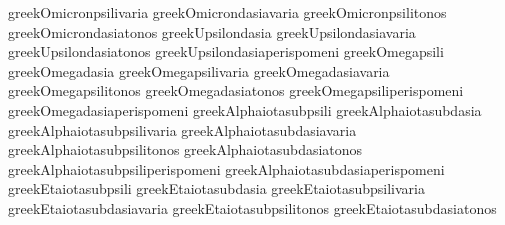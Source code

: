  greekOmicronpsilivaria            {\greekpsilivaria \greekOmicron}
 greekOmicrondasiavaria            {\greekdasiavaria \greekOmicron}
 greekOmicronpsilitonos            {\greekpsilitonos \greekOmicron}
 greekOmicrondasiatonos            {\greekdasiatonos \greekOmicron}
 greekUpsilondasia                 {\greekdasia \greekUpsilon}
 greekUpsilondasiavaria            {\greekdasiavaria \greekUpsilon}
 greekUpsilondasiatonos            {\greekdasiatonos \greekUpsilon}
 greekUpsilondasiaperispomeni      {\greekdasiaperispomeni \greekUpsilon}
 greekOmegapsili                   {\greekpsili \greekOmega}
 greekOmegadasia                   {\greekdasia \greekOmega}
 greekOmegapsilivaria              {\greekpsilivaria \greekOmega}
 greekOmegadasiavaria              {\greekdasiavaria \greekOmega}
 greekOmegapsilitonos              {\greekpsilitonos \greekOmega}
 greekOmegadasiatonos              {\greekdasiatonos \greekOmega}
 greekOmegapsiliperispomeni        {\greekpsiliperispomeni \greekOmega}
 greekOmegadasiaperispomeni        {\greekdasiaperispomeni \greekOmega}
 greekAlphaiotasubpsili            {\greekpsili \greekAlpha \greekiota}
 greekAlphaiotasubdasia            {\greekdasia \greekAlpha \greekiota}
 greekAlphaiotasubpsilivaria       {\greekpsilivaria \greekAlpha \greekiota}
 greekAlphaiotasubdasiavaria       {\greekdasiavaria \greekAlpha \greekiota}
 greekAlphaiotasubpsilitonos       {\greekpsilitonos \greekAlpha \greekiota}
 greekAlphaiotasubdasiatonos       {\greekdasiatonos \greekAlpha \greekiota}
 greekAlphaiotasubpsiliperispomeni {\greekpsiliperispomeni \greekAlpha \greekiota}
 greekAlphaiotasubdasiaperispomeni {\greekdasiaperispomeni \greekAlpha \greekiota}
 greekEtaiotasubpsili              {\greekpsili \greekEta \greekiota}
 greekEtaiotasubdasia              {\greekdasia \greekEta \greekiota}
 greekEtaiotasubpsilivaria         {\greekpsilivaria \greekEta \greekiota}
 greekEtaiotasubdasiavaria         {\greekdasiavaria \greekEta \greekiota}
 greekEtaiotasubpsilitonos         {\greekpsilitonos \greekEta \greekiota}
 greekEtaiotasubdasiatonos         {\greekdasiatonos \greekEta \greekiota}
